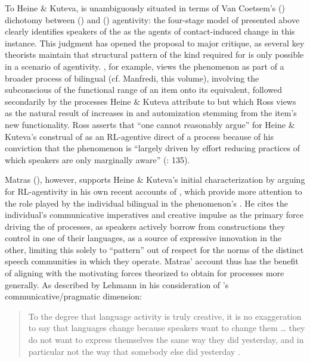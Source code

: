 \documentclass[output=paper]{langsci/langscibook}
\begin{document}
To Heine \& Kuteva,  is unambiguously situated in terms of Van Coetsem’s (\citeyear{VanCoetsem1988,VanCoetsem2000}) dichotomy between  () and  () agentivity: the four-stage model of  presented above clearly identifies speakers of the  as the agents of contact-induced change in this instance. This judgment has opened the proposal to major critique, as several key theorists maintain that structural pattern  of the kind required for  is only possible in a scenario of  agentivity. \citet{Ross2007}, for example, views the phenomenon as part of a broader process of bilingual  (cf. Manfredi, this volume), involving the subconscious  of the functional range of an  item onto its  equivalent, followed secondarily by the processes Heine \& Kuteva attribute to  but which Ross views as the natural result of increases in  and automization stemming from the  item’s new functionality. Ross asserts that “one cannot reasonably argue” for Heine \& Kuteva’s construal of  as an RL-agentive direct  of a  process because of his conviction that the phenomenon is “largely driven by effort reducing practices of which speakers are only marginally aware” (\citeyear{Ross2007}: 135). 

Matras (\citeyear{Matras2009,Matras2011gram}), however, supports Heine \& Kuteva’s initial characterization by arguing for RL-agentivity in his own recent accounts of , which provide more attention to the role played by the individual bilingual in the phenomenon’s . He cites the individual’s communicative imperatives and creative impulse as the primary force driving the  of  processes, as speakers actively borrow from constructions they control in one of their languages, as a source of expressive innovation in the other, limiting this  solely to “pattern” out of respect for the norms of the distinct speech communities in which they operate. Matras’ account thus has the benefit of aligning with the motivating forces theorized to obtain for  processes more generally. As described by Lehmann in his consideration of ’s communicative/pragmatic dimension:

\begin{quote}
To the degree that language activity is truly creative, it is no exaggeration to say that languages change because speakers want to change them … they do not want to express themselves the same way they did yesterday, and in particular not the way that somebody else did yesterday \citep[315]{Lehmann1985}.
\end{quote}
\end{document}
